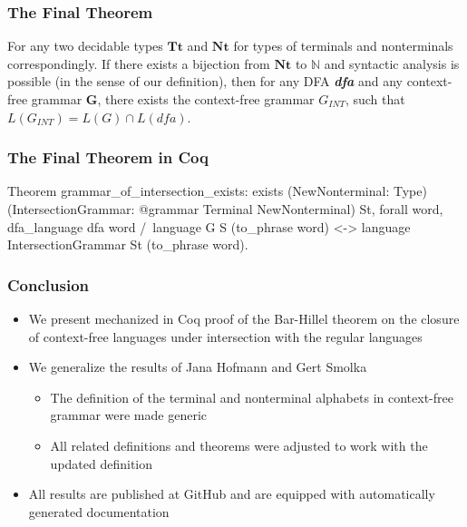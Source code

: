 \documentclass[xcolor=table]{beamer}
\begin{document}
\begin{frame}[fragile] \frametitle{The Final Theorem}

\begin{theorem}
    For any two decidable types $\textbf{Tt}$ and $\textbf{Nt}$ for types of terminals and nonterminals correspondingly. If there exists a bijection from $\textbf{Nt}$ to $\mathbb{N}$ and syntactic analysis is possible (in the sense of our definition), then for any DFA \textbf{\textit{dfa}} and any context-free grammar $\textbf{G}$, there exists the context-free grammar $G_{INT}$, such that $L(G_{INT}) = L(G) \cap L(\textit{dfa})$.
\end{theorem}

\end{frame}

\begin{frame}[fragile] \frametitle{The Final Theorem in Coq}

      \begin{pyglist}[language=coq, numbers=none, numbersep=5pt]

  Theorem grammar_of_intersection_exists:
    exists
     (NewNonterminal: Type)
     (IntersectionGrammar: @grammar Terminal NewNonterminal)
     St,
    forall word,
      dfa_language dfa word /\ language G S (to_phrase word)
      <->
      language IntersectionGrammar St (to_phrase word).
     \end{pyglist}

\end{frame}

\begin{frame} \frametitle{Conclusion}

\begin{itemize}
 \item We present mechanized in Coq proof of the Bar-Hillel theorem on the closure of context-free languages under intersection with the regular languages
 \item We generalize the results of Jana Hofmann and Gert Smolka
 \begin{itemize}
   \item The definition of the terminal and nonterminal alphabets in context-free grammar were made generic
   \item All related definitions and theorems were adjusted to work with the updated definition

 \end{itemize}

 \item All results are published at GitHub and are equipped with automatically generated documentation

\end{itemize}

\end{frame}
\end{document}
